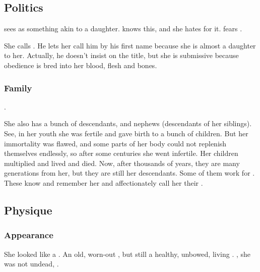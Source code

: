 \subsection{Politics}
\Ishnaruchaefir{} sees \Criseis{} as something akin to a daughter. 
\Nzessuacrith{} knows this, and she hates \Criseis{} for it. 
\Criseis{} fears \Nzessuacrith. 

She calls \Ishnaruchaefir{} . 
He lets her call him by his first name because she is almost a daughter to her. 
Actually, he doesn't insist on the title, but she is submissive because obedience is bred into her \scathaese{} blood, flesh and bones. 





\subsubsection{Family}
\Criseis{} . 

She also has a bunch of descendants, and nephews (descendants of her siblings). 
See, in her youth she was fertile and gave birth to a bunch of children. 
But her immortality was flawed, and some parts of her body could not replenish themselves endlessly, so after some centuries she went infertile. 
Her children multiplied and lived and died. 
Now, after thousands of years, they are many generations from her, but they are still her descendants. 
Some of them work for \Ishnaruchaefir{}. 
These know and remember her and affectionately call her their . 









\subsection{Physique}





\subsubsection{Appearance}
She looked like a \scatha. 
An old, worn-out \scatha, but still a healthy, unbowed, living \scatha.
, she was not undead, .










